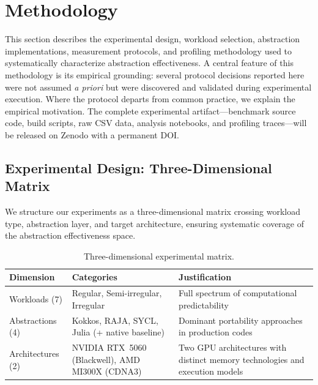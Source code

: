 
\section{Methodology}
\label{sec:methodology}

This section describes the experimental design, workload selection, abstraction
implementations, measurement protocols, and profiling methodology used to
systematically characterize abstraction effectiveness. A central feature of this
methodology is its empirical grounding: several protocol decisions reported here
were not assumed \emph{a priori} but were discovered and validated during
experimental execution. Where the protocol departs from common practice, we
explain the empirical motivation. The complete experimental artifact---benchmark
source code, build scripts, raw CSV data, analysis notebooks, and profiling
traces---will be released on Zenodo with a permanent DOI.

\subsection{Experimental Design: Three-Dimensional Matrix}
\label{subsec:3d-matrix}

We structure our experiments as a three-dimensional matrix crossing workload
type, abstraction layer, and target architecture, ensuring systematic coverage
of the abstraction effectiveness space.

\begin{table}[h]
\centering
\caption{Three-dimensional experimental matrix.}
\label{tab:3d-matrix}
\begin{tabular}{p{2.5cm}p{5.5cm}p{5.5cm}}
\hline
\textbf{Dimension} & \textbf{Categories} & \textbf{Justification} \\
\hline
Workloads (7)
  & Regular, Semi-irregular, Irregular
  & Full spectrum of computational predictability \\[4pt]
Abstractions (4)
  & Kokkos, RAJA, SYCL, Julia (+ native baseline)
  & Dominant portability approaches in production codes~\cite{Evans2022} \\[4pt]
Architectures (2)
  & NVIDIA RTX~5060 (Blackwell), AMD MI300X (CDNA3)
  & Two GPU architectures with distinct memory technologies and execution
    models \\
\hline
\end{tabular}
\end{table}

